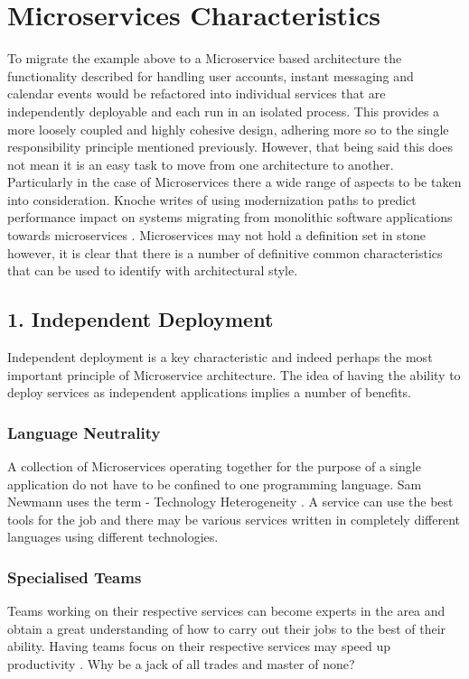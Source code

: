 \section{Microservices Characteristics}

To migrate the example above to a Microservice based architecture the functionality described for handling user accounts, instant messaging and calendar events would be refactored into individual services that are independently deployable and each run in an isolated process. This provides a more loosely coupled and highly cohesive design, adhering more so to the single responsibility principle mentioned previously. However, that being said this does not mean it is an easy task to move from one architecture to another. Particularly in the case of Microservices there a wide range of aspects to be taken into consideration. Knoche writes of using modernization paths to predict performance impact on systems migrating from monolithic software applications towards microservices \cite{Knoche:2016:SRP:2851553.2892039}.
Microservices may not hold a definition set in stone however, it is clear that there is a number of definitive common characteristics that can be used to identify with architectural style.

\subsection*{ 1. Independent Deployment }
Independent deployment is a key characteristic and indeed perhaps the most important principle of Microservice architecture. The idea of having the ability to deploy services as independent applications implies a number of benefits.

\subsubsection*{Language Neutrality}
A collection of Microservices operating together for the purpose of a single application do not have to be confined to one programming language. Sam Newmann uses the term - Technology Heterogeneity \cite{BuildingMicroServices}. A service can use the best tools for the job and there may be various services written in completely different languages using different technologies.

\subsubsection*{Specialised Teams}
Teams working on their respective services can become experts in the area and obtain a great understanding of how to carry out their jobs to the best of their ability. Having teams focus on their respective services may speed up productivity \cite{BuildingMicroServices}. Why be a jack of all trades and master of none?

